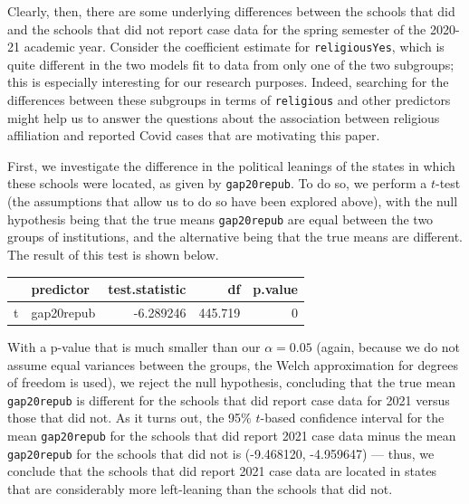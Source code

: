 \documentclass[
]{article}
\begin{document}
Clearly, then, there are some underlying differences between the schools
that did and the schools that did not report case data for the spring
semester of the 2020-21 academic year. Consider the coefficient estimate
for \texttt{religiousYes}, which is quite different in the two models
fit to data from only one of the two subgroups; this is especially
interesting for our research purposes. Indeed, searching for the
differences between these subgroups in terms of \texttt{religious} and
other predictors might help us to answer the questions about the
association between religious affiliation and reported Covid cases that
are motivating this paper.

First, we investigate the difference in the political leanings of the
states in which these schools were located, as given by
\texttt{gap20repub}. To do so, we perform a \(t\)-test (the assumptions
that allow us to do so have been explored above), with the null
hypothesis being that the true means \texttt{gap20repub} are equal
between the two groups of institutions, and the alternative being that
the true means are different. The result of this test is shown below.

\begin{center}

\begin{tabular}{l|l|r|r|r}
\hline
  & predictor & test.statistic & df & p.value\\
\hline
t & gap20repub & -6.289246 & 445.719 & 0\\
\hline
\end{tabular}
\end{center}

With a p-value that is much smaller than our \(\alpha =0.05\) (again,
because we do not assume equal variances between the groups, the Welch
approximation for degrees of freedom is used), we reject the null
hypothesis, concluding that the true mean \texttt{gap20repub} is
different for the schools that did report case data for 2021 versus
those that did not. As it turns out, the 95\% \(t\)-based confidence
interval for the mean \texttt{gap20repub} for the schools that did
report 2021 case data minus the mean \texttt{gap20repub} for the schools
that did not is (-9.468120, -4.959647) --- thus, we conclude that the
schools that did report 2021 case data are located in states that are
considerably more left-leaning than the schools that did not.
\end{document}
